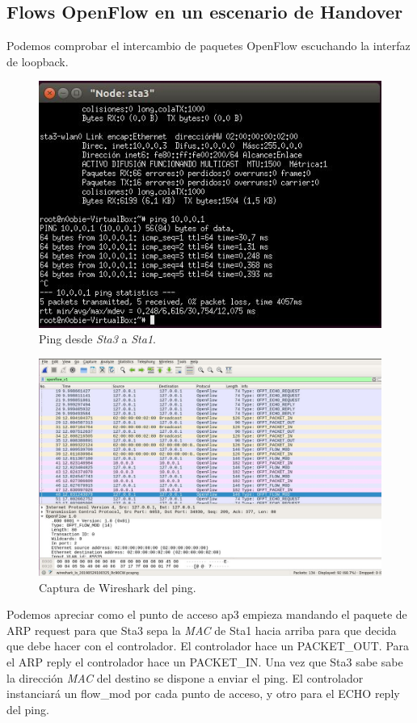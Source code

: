 \subsection{Flows OpenFlow en un escenario de Handover}
Podemos comprobar el intercambio de paquetes OpenFlow escuchando la interfaz de loopback.
\newpage
\begin{figure}[!htb]
  \centering
    \includegraphics[width=0.8\linewidth]{./img/test/15.JPG}
    \caption{Ping desde \textit{Sta3} a \textit{Sta1}.}
  \label{fig:yo}
\end{figure}
\begin{figure}[!htb]
  \centering
    \includegraphics[width=\linewidth]{./img/test/16.JPG}
    \caption{Captura de Wireshark del ping.}
  \label{fig:yo}
\end{figure}
\newpage
Podemos apreciar como el punto de acceso ap3 empieza mandando el paquete de ARP request para que Sta3 sepa la \textit{MAC} de Sta1 hacia arriba para que decida que debe hacer con el controlador. El controlador hace un PACKET\_OUT. Para el ARP reply el controlador hace un PACKET\_IN. Una vez que Sta3 sabe sabe la dirección \textit{MAC} del destino se dispone a enviar el ping. El controlador instanciará un flow\_mod por cada punto de acceso, y otro para el ECHO reply del ping.


